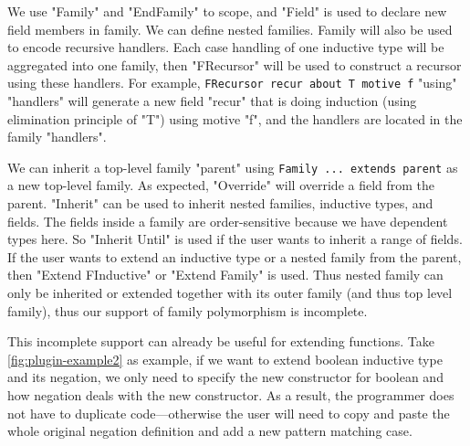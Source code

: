 We use "Family" and "EndFamily" to scope, and "Field" is used to declare new field members in family.
We can define nested families.
Family will also be used to encode recursive handlers. Each case
handling of one inductive type will be aggregated into one family, then
"FRecursor" will be used to construct a recursor using these handlers.
For example, \texttt{FRecursor recur about T motive f} "using"
"handlers" will generate a new field "recur" that is doing induction
(using elimination principle of "T") using motive "f", and the handlers
are located in the family "handlers".

We can inherit a top-level family "parent" using \texttt{Family
... extends parent} as a new top-level family. As expected, "Override"
will override a field from the parent. "Inherit" can be used to inherit
nested families, inductive types, and fields. The fields inside a family
are order-sensitive because we have dependent types here. So "Inherit
Until" is used if the user wants to inherit a range of fields. If the
user wants to extend an inductive type or a nested family from the
parent, then "Extend FInductive" or "Extend Family" is used. Thus nested
family can only be inherited or extended together with its outer family
(and thus top level family), thus our support of family polymorphism is
incomplete.

This incomplete support can already be useful for extending functions.
Take \cref{fig:plugin-example2} as example, if we want to extend boolean
inductive type and its negation, we only need to specify the new
constructor for boolean and how negation deals with the new constructor.
As a result, the programmer does not have to duplicate code---otherwise
the user will need to copy and paste the whole original negation
definition and add a new pattern matching case.
